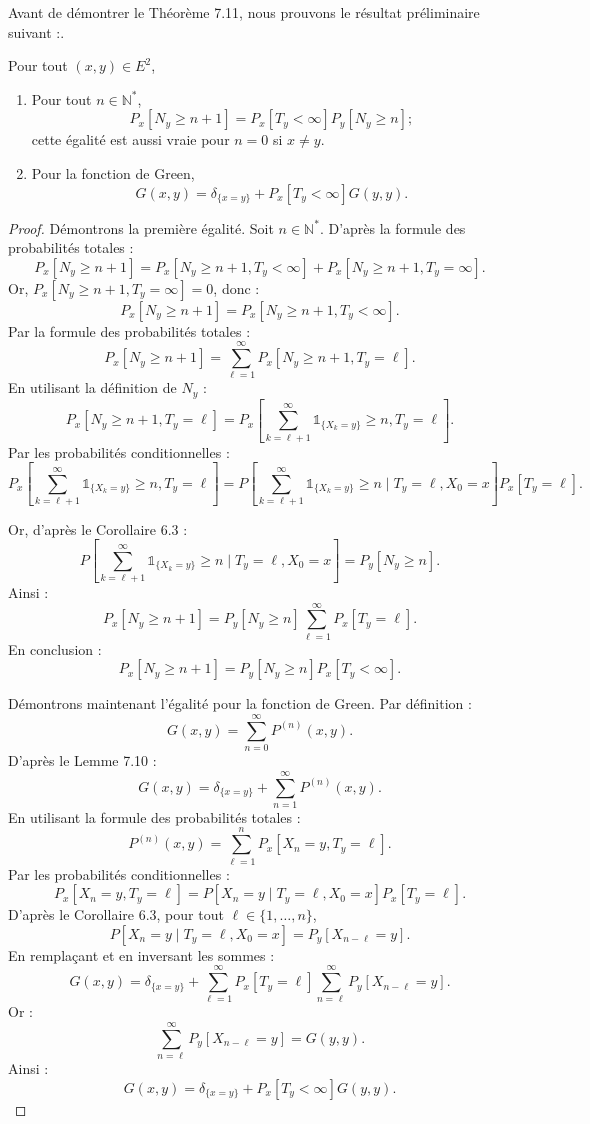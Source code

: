 Avant de démontrer le Théorème 7.11, nous prouvons le résultat préliminaire suivant :.

\begin{lemme}[7.12]
Pour tout \((x, y) \in E^2\),
\begin{enumerate}
    \item Pour tout \(n \in \mathbb{N}^*\),
    \[
    P_x[N_y \geq n + 1] = P_x[T_y < \infty]P_y[N_y \geq n];
    \]
    cette égalité est aussi vraie pour \(n = 0\) si \(x \neq y\).

    \item Pour la fonction de Green,
    \[
    G(x, y) = \delta_{\{x=y\}} + P_x[T_y < \infty]G(y, y).
    \]
\end{enumerate}
\end{lemme}

\begin{proof}
Démontrons la première égalité. Soit \(n \in \mathbb{N}^*\). D’après la formule des probabilités totales :
\[
P_x[N_y \geq n + 1] = P_x[N_y \geq n + 1, T_y < \infty] + P_x[N_y \geq n + 1, T_y = \infty].
\]
Or, \(P_x[N_y \geq n + 1, T_y = \infty] = 0\), donc :
\[
P_x[N_y \geq n + 1] = P_x[N_y \geq n + 1, T_y < \infty].
\]
Par la formule des probabilités totales :
\[
P_x[N_y \geq n + 1] = \sum_{\ell=1}^\infty P_x[N_y \geq n + 1, T_y = \ell].
\]
En utilisant la définition de \(N_y\) :
\[
P_x[N_y \geq n + 1, T_y = \ell] = P_x\left[\sum_{k=\ell+1}^\infty \mathds{1}_{\{X_k = y\}} \geq n, T_y = \ell \right].
\]
Par les probabilités conditionnelles :
\[
P_x\left[\sum_{k=\ell+1}^\infty \mathds{1}_{\{X_k = y\}} \geq n, T_y = \ell \right] = P\left[\sum_{k=\ell+1}^\infty \mathds{1}_{\{X_k = y\}} \geq n \mid T_y = \ell, X_0 = x \right] P_x[T_y = \ell].
\]

Or, d’après le Corollaire 6.3 :
\[
P\left[\sum_{k=\ell+1}^\infty \mathds{1}_{\{X_k = y\}} \geq n \mid T_y = \ell, X_0 = x \right] = P_y[N_y \geq n].
\]
Ainsi :
\[
P_x[N_y \geq n + 1] = P_y[N_y \geq n] \sum_{\ell=1}^\infty P_x[T_y = \ell].
\]
En conclusion :
\[
P_x[N_y \geq n + 1] = P_y[N_y \geq n]P_x[T_y < \infty].
\]

Démontrons maintenant l’égalité pour la fonction de Green. Par définition :
\[
G(x, y) = \sum_{n=0}^\infty P^{(n)}(x, y).
\]
D’après le Lemme 7.10 :
\[
G(x, y) = \delta_{\{x=y\}} + \sum_{n=1}^\infty P^{(n)}(x, y).
\]
En utilisant la formule des probabilités totales :
\[
P^{(n)}(x, y) = \sum_{\ell=1}^n P_x[X_n = y, T_y = \ell].
\]
Par les probabilités conditionnelles :
\[
P_x[X_n = y, T_y = \ell] = P[X_n = y \mid T_y = \ell, X_0 = x]P_x[T_y = \ell].
\]
D’après le Corollaire 6.3, pour tout \(\ell \in \{1, \dots, n\}\),
\[
P[X_n = y \mid T_y = \ell, X_0 = x] = P_y[X_{n-\ell} = y].
\]
En remplaçant et en inversant les sommes :
\[
G(x, y) = \delta_{\{x=y\}} + \sum_{\ell=1}^\infty P_x[T_y = \ell] \sum_{n=\ell}^\infty P_y[X_{n-\ell} = y].
\]
Or :
\[
\sum_{n=\ell}^\infty P_y[X_{n-\ell} = y] = G(y, y).
\]
Ainsi :
\[
G(x, y) = \delta_{\{x=y\}} + P_x[T_y < \infty]G(y, y).
\]
\end{proof}



